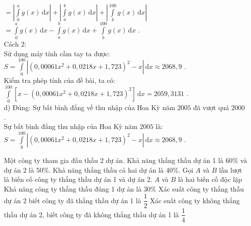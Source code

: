 \begin{ex}
{$=\left|\displaystyle\int\limits_0^a{g(x)\mathrm{\,d}x}\right|+\left|\displaystyle\int\limits_a^b{g(x)\mathrm{\,d}x}\right|+\left|\displaystyle\int\limits_b^{100}{g(x)\mathrm{\,d}x}\right|$ $=\displaystyle\int\limits_0^a{g(x)\mathrm{\,d}x}-\displaystyle\int\limits_a^b{g(x)\mathrm{\,d}x}+\displaystyle\int\limits_b^{100}{g(x)\mathrm{\,d}x}$ .\\
Cách 2:\\
Sử dụng máy tính cầm tay ta được: $S=\displaystyle\int\limits_0^{100}{\left|\left(0,00061x^2+0,0218x+1,723\right)^2-x\right|\mathrm{\,d}x}\approx 2068,9$ .\\
Kiểm tra phép tính của đề bài, ta có: $\displaystyle\int\limits_0^{100}{\left[x-\left(0,00061x^2+0,0218x+1,723\right)^2\right]\mathrm{\,d}x}=2059,3131$ .\\
d) Đúng: Sự bất bình đẳng về thu nhập của Hoa Kỳ năm $2005$ đã vượt quá $2000$ .\\
Sự bất bình đẳng thu nhập của Hoa Kỳ năm $2005$ là:\\
$S=\displaystyle\int\limits_0^{100}{\left|\left(0,00061x^2+0,0218x+1,723\right)^2-x\right|\mathrm{\,d}x}\approx 2068,9$ .}
\end{ex}

\begin{ex}%
Một công ty tham gia đấu thầu 2 dự án. Khả năng thắng thầu dự án 1 là 60\% và dự án 2 là 50\%. Khả năng thắng thầu cả hai dự án là 40\%. Gọi $ A$ và $ B$ lần lượt là biến cố công ty thắng thầu dự án 1 và dự án 2.
\choiceTF
{$ A$ và $ B$ là hai biến cố độc lập}
{\True Khả năng công ty thắng thầu đúng 1 dự án là 30\%}
{Xác suất công ty thắng thầu dự án 2 biết công ty đã thắng thầu dự án 1 là $\dfrac{1}{2}$}
{Xác suất công ty không thắng thầu dự án 2, biết công ty đã không thắng thầu dự án 1 là $\dfrac{1}{4}$}
\end{ex}

